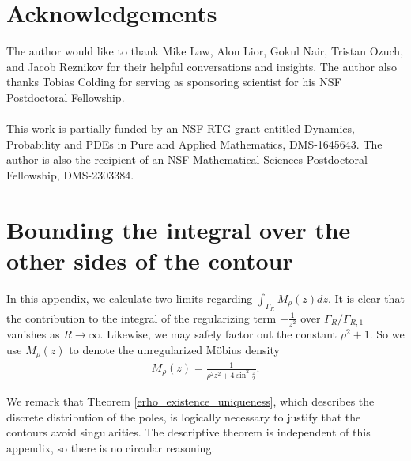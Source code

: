 \documentclass{amsart}
\theoremstyle{plain}
\numberwithin{theorem}{section}
\theoremstyle{definition}
\theoremstyle{remark}
\theoremstyle{brakets}
\begin{document}
%











\section*{Acknowledgements}
The author would like to thank Mike Law, Alon Lior, Gokul Nair, Tristan Ozuch, and Jacob Reznikov for their helpful conversations and insights. The author also thanks Tobias Colding for serving as sponsoring scientist for his NSF Postdoctoral Fellowship.
\\
\\
\noindent This work is partially funded by an NSF RTG grant entitled Dynamics, Probability and PDEs in Pure and Applied Mathematics, DMS-1645643. The author is also the recipient of an NSF Mathematical Sciences Postdoctoral Fellowship, DMS-2303384.



\appendix
\section{Bounding the integral over the other sides of the contour}
In this appendix, we calculate two limits regarding $\int_{\Gamma_{R}} M_\rho(z)dz$. It is clear that the contribution to the integral of the regularizing term $-\frac{1}{z^2}$ over $\Gamma_{R} / \Gamma_{R,1}$ vanishes as $R \to \infty$. Likewise, we may safely factor out the constant $\rho^2 + 1$.  So we use $M_\rho(z)$ to denote the unregularized M\"obius density
\begin{align*}
    M_\rho(z) = \frac{1}{\rho^2z^2 + 4\sin^2\frac{z}{2}}.
\end{align*}

We remark that Theorem \ref{erho_existence_uniqueness}, which describes the discrete distribution of the poles, is logically necessary to justify that the contours avoid singularities. The descriptive theorem is independent of this appendix, so there is no circular reasoning.
\end{document}
